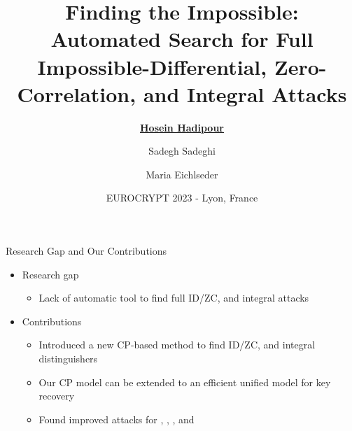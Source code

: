 \documentclass[table,aspectratio=169]{beamer}
\title{Finding the Impossible:\\
{Automated Search for Full Impossible-Differential, Zero-Correlation, and Integral Attacks}}
\author{\underline{\textbf{Hosein Hadipour}} \and Sadegh Sadeghi \and Maria Eichlseder}
\date{EUROCRYPT 2023 - Lyon, France}
\begin{document}
\begin{frame}[plain]
  \maketitle
\end{frame}

\begin{frame}{Research Gap and Our Contributions}
\begin{itemize}
	\item<1->[\faBinoculars] Research gap
	\begin{itemize}
		\item[\faCheckCircleO] Lack of automatic tool to find full ID/ZC, and integral attacks
	\end{itemize}
	\item<2->[\faDiamond] Contributions
	\begin{itemize}
		\item<2->[\faCheckCircle] Introduced a new CP-based method to find ID/ZC, and integral distinguishers
		\item<2->[\faCheckCircle] Our CP model can be extended to an efficient unified model for key recovery
		\item<2->[\faCheckCircle] Found improved attacks for , , , and 
	\end{itemize}
\end{itemize}
\end{frame}
\end{document}
